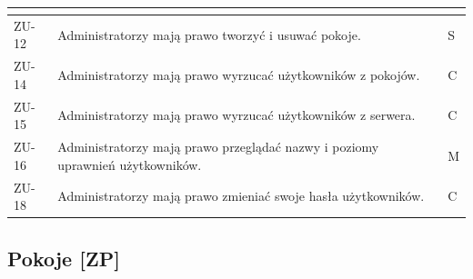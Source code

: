 \begin{tabular}{ | l | l | l | }
{      } \\

    \hline
      \parbox[t]{1.2cm}{
        ZU-12

      } & \parbox[t]{12.1cm}{\strut
        Administratorzy mają prawo tworzyć i usuwać pokoje.

      \strut} & \parbox{1.8cm}{
        S

      } \\

    \hline
      \parbox[t]{1.2cm}{
        ZU-14

      } & \parbox[t]{12.1cm}{\strut
        Administratorzy mają prawo wyrzucać użytkowników z pokojów.

      \strut} & \parbox{1.8cm}{
        C

      } \\

    \hline
      \parbox[t]{1.2cm}{
        ZU-15

      } & \parbox[t]{12.1cm}{\strut
        Administratorzy mają prawo wyrzucać użytkowników z serwera.

      \strut} & \parbox{1.8cm}{
        C

      } \\

    \hline
      \parbox[t]{1.2cm}{
        ZU-16

      } & \parbox[t]{12.1cm}{\strut
        Administratorzy mają prawo przeglądać nazwy i poziomy uprawnień użytkowników.

      \strut} & \parbox{1.8cm}{
        M

      } \\

    \hline
      \parbox[t]{1.2cm}{
        ZU-18

      } & \parbox[t]{12.1cm}{\strut
        Administratorzy mają prawo zmieniać swoje hasła użytkowników.

      \strut} & \parbox{1.8cm}{
        C

      } \\

    \hline
  \end{tabular}

\newpage

\subsection{Pokoje [ZP]}

\leavevmode\hbox{}

